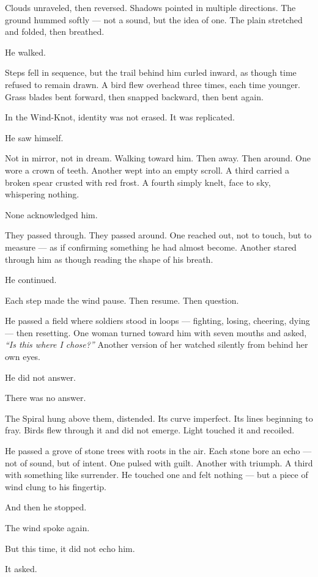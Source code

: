 \documentclass[9pt]{article}
\begin{document}
Clouds unraveled, then reversed. Shadows pointed in multiple directions. The ground hummed softly — not a sound, but the idea of one. The plain stretched and folded, then breathed.

He walked.

Steps fell in sequence, but the trail behind him curled inward, as though time refused to remain drawn. A bird flew overhead three times, each time younger. Grass blades bent forward, then snapped backward, then bent again.

In the Wind-Knot, identity was not erased. It was replicated.

He saw himself.

Not in mirror, not in dream. Walking toward him. Then away. Then around. One wore a crown of teeth. Another wept into an empty scroll. A third carried a broken spear crusted with red frost. A fourth simply knelt, face to sky, whispering nothing.

None acknowledged him.

They passed through. They passed around. One reached out, not to touch, but to measure — as if confirming something he had almost become. Another stared through him as though reading the shape of his breath.

He continued.

Each step made the wind pause. Then resume. Then question.

He passed a field where soldiers stood in loops — fighting, losing, cheering, dying — then resetting. One woman turned toward him with seven mouths and asked, \textit{``Is this where I chose?''} Another version of her watched silently from behind her own eyes.

He did not answer.

There was no answer.

The Spiral hung above them, distended. Its curve imperfect. Its lines beginning to fray. Birds flew through it and did not emerge. Light touched it and recoiled.

He passed a grove of stone trees with roots in the air. Each stone bore an echo — not of sound, but of intent. One pulsed with guilt. Another with triumph. A third with something like surrender. He touched one and felt nothing — but a piece of wind clung to his fingertip.

And then he stopped.

The wind spoke again.

But this time, it did not echo him.

It asked.
\end{document}
